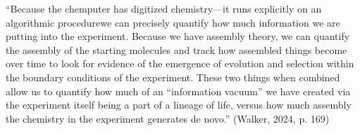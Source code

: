 \markdownRendererUlItem “Because the chemputer has digitized chemistry—it runs explicitly on an algorithmic procedurewe can precisely quantify how much information we are putting into the experiment. Because we have assembly theory, we can quantify the assembly of the starting molecules and track how assembled things become over time to look for evidence of the emergence of evolution and selection within the boundary conditions of the experiment. These two things when combined allow us to quantify how much of an “information vacuum” we have created via the experiment itself being a part of a lineage of life, versus how much assembly the chemistry in the experiment generates de novo.” (Walker, 2024, p. 169)\markdownRendererUlItemEnd 
\markdownRendererUlEndTight \markdownRendererInterblockSeparator
{}\markdownRendererDocumentEnd